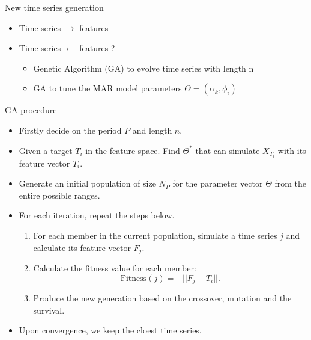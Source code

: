 \documentclass[11pt,ignorenonframetext,compress]{beamer}
\providecommand{\tightlist}{%
  \setlength{\itemsep}{0pt}\setlength{\parskip}{0pt}}
\begin{document}
\begin{frame}{New time series generation}

  \begin{itemize}
  \item
    Time series \(\rightarrow\) features \checkmark
  \item
    Time series \(\leftarrow\) features ?

    \begin{itemize}
      \tightlist
    \item
      Genetic Algorithm (GA) to evolve time series with length n
    \item
      GA to tune the MAR model parameters \(\Theta = (\alpha_k, \phi_i)\)
    \end{itemize}
  \end{itemize}

\end{frame}

\begin{frame}{GA procedure}

  \begin{itemize}
    \tightlist
  \item
    Firstly decide on the period \(P\) and length \(n\).
  \item
    Given a target \(T_i\) in the feature space. Find \(\Theta^{*}\) that
    can simulate \(X_{T_i}\) with its feature vector \(T_i\).
  \item
    Generate an initial population of size \(N_P\) for the parameter
    vector \(\Theta\) from the entire possible ranges.
  \item
    For each iteration, repeat the steps below.

    \begin{enumerate}
      \def\labelenumi{\arabic{enumi}.}
      \tightlist
    \item
      For each member in the current population, simulate a time series
      \(j\) and calculate its feature vector \(F_j\).
    \item
      Calculate the fitness value for each member:
      \[\text{Fitness}(j) = - ||F_j-T_i||.\]
    \item
      Produce the new generation based on the crossover, mutation and the
      survival.
    \end{enumerate}
  \item
    Upon convergence, we keep the cloest time series.
  \end{itemize}



\end{frame}
\end{document}
